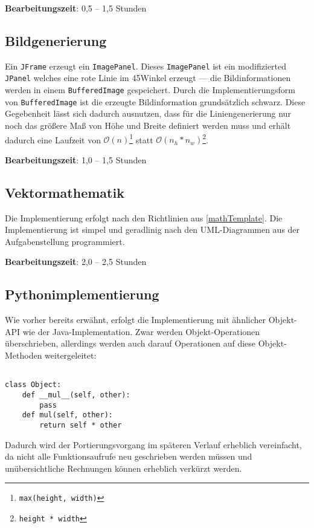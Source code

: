 \documentclass[tog]{acmsiggraph}
\newcommand{\code}[1]{\texttt{#1}}
\begin{document}
\textbf{Bearbeitungszeit}: 0,5 -- 1,5 Stunden

\subsection{Bildgenerierung}

Ein \code{JFrame} erzeugt ein \code{ImagePanel}. Dieses \code{ImagePanel} ist ein modifizierted \code{JPanel} welches eine rote Linie im 45\degree Winkel erzeugt --- die Bildinformationen werden in einem \code{BufferedImage} gespeichert. Durch die Implementierungsform von \code{BufferedImage} ist die erzeugte Bildinformation grundsätzlich schwarz. Diese Gegebenheit lässt sich dadurch ausnutzen, dass für die Liniengenerierung nur noch das größere Maß von Höhe und Breite definiert werden muss und erhält dadurch eine Laufzeit von $\mathcal O(n) $\footnote{\code{max(height, width)}} statt $\mathcal O(n_{h}*n_{w}) $\footnote{\code{height * width}}.

\textbf{Bearbeitungszeit}: 1,0 -- 1,5 Stunden

\subsection{Vektormathematik}

Die Implementierung erfolgt nach den Richtlinien aus \ref{mathTemplate}. Die Implementierung ist simpel und geradlinig nach den UML-Diagrammen aus der Aufgabenstellung programmiert.

\textbf{Bearbeitungszeit}: 2,0 -- 2,5 Stunden

\subsection{Pythonimplementierung}

Wie vorher bereits erwähnt, erfolgt die Implementierung mit ähnlicher Objekt-API wie der Java-Implementation. Zwar werden Objekt-Operationen überschrieben, allerdings werden auch darauf Operationen auf diese Objekt-Methoden weitergeleitet: \newline

\lstset{language=Python} 
\begin{lstlisting}

class Object:
	def __mul__(self, other):
		pass
	def mul(self, other):
		return self * other

\end{lstlisting}

Dadurch wird der Portierungsvorgang im späteren Verlauf erheblich vereinfacht, da nicht alle Funktionsaufrufe neu geschrieben werden müssen und unübersichtliche Rechnungen können erheblich verkürzt werden.
\end{document}
